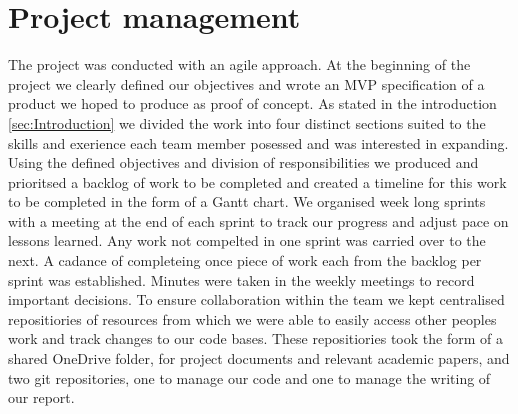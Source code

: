 


\section{Project management}

The project was conducted with an agile approach. 
At the beginning of the project we clearly defined our objectives and wrote an MVP specification of a product we hoped to produce as proof of concept.
As stated in the introduction \ref{sec:Introduction} we divided the work into four distinct sections suited to the skills and exerience each team member posessed and was interested in expanding.
Using the defined objectives and division of responsibilities we produced and prioritsed a backlog of work to be completed and created a timeline for this work to be completed in the form of a Gantt chart.
We organised week long sprints with a meeting at the end of each sprint to track our progress and adjust pace on lessons learned. 
Any work not compelted in one sprint was carried over to the next.
A cadance of completeing once piece of work each from the backlog per sprint was established.
Minutes were taken in the weekly meetings to record important decisions.
To ensure collaboration within the team we kept centralised repositiories of resources from which we were able to easily access other peoples work and track changes to our code bases.
These repositiories took the form of a shared OneDrive folder, for project documents and relevant academic papers, and two git repositories, one to manage our code and one to manage the writing of our report.


